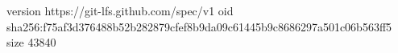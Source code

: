 version https://git-lfs.github.com/spec/v1
oid sha256:f75af3d376488b52b282879cfef8b9da09c61445b9c8686297a501c06b563ff5
size 43840
